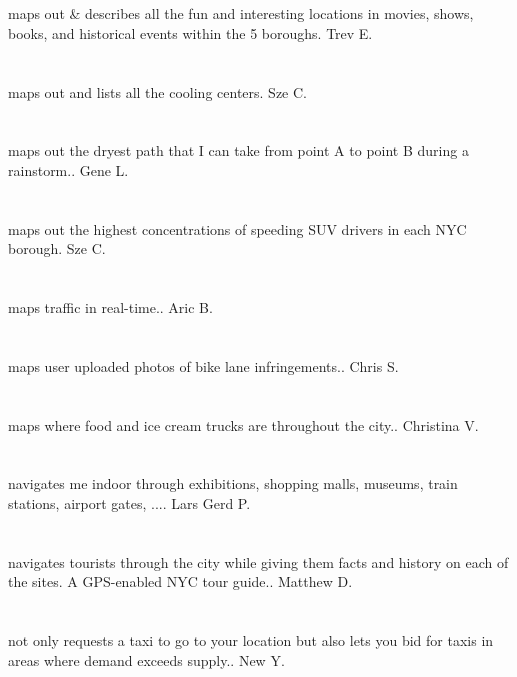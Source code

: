\section{}maps out \& describes all the fun and interesting locations in movies,  shows,  books,  and historical events within the 5 boroughs. Trev E.
\section{}maps out and lists all the cooling centers. Sze C.
\section{}maps out the dryest path that I can take from point A to point B during a rainstorm.. Gene L.
\section{}maps out the highest concentrations of speeding SUV drivers in each NYC borough. Sze C.
\section{}maps traffic in real-time.. Aric B.
\section{}maps user uploaded photos of bike lane infringements.. Chris S.
\section{} maps where food and ice cream trucks are throughout the city.. Christina  V.
\section{}navigates me indoor through exhibitions,  shopping malls,  museums,  train stations,  airport gates,  .... Lars Gerd P.
\section{}navigates tourists through the city while giving them facts and history on each of the sites.  A GPS-enabled NYC tour guide.. Matthew D.
\section{}not only requests a taxi to go to your location but also lets you bid for taxis in areas where demand exceeds supply.. New Y.
